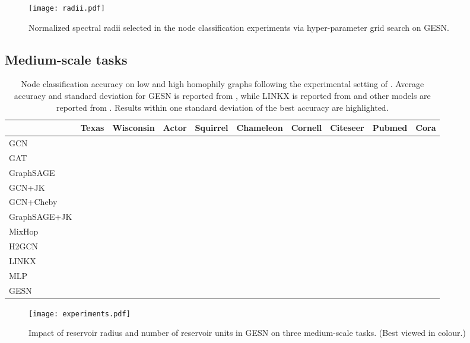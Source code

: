 \documentclass[final,5p,times,twocolumn]{elsarticle}
\begin{document}
\begin{figure}
	\centering
	\texttt{[image: radii.pdf]}
	\caption{Normalized spectral radii  selected in the node classification experiments via hyper-parameter grid search on GESN.}
	\label{fig:radii}
\end{figure}

\subsection{Medium-scale tasks}
\label{sec:experiments-medium}



\begin{table*}
	\centering
\begingroup
	\setlength{\tabcolsep}{4pt}
	\begin{tabular}{lccccccccc}
		\toprule
		& \textbf{Texas} & \textbf{Wisconsin} & \textbf{Actor} & \textbf{Squirrel} & \textbf{Chameleon} & \textbf{Cornell} & \textbf{Citeseer} & \textbf{Pubmed} & \textbf{Cora} \\
		\midrule
		GCN &  &  &  &  &  &  &  &  &  \\
		GAT &  &  &  &  &  &  &  &  &  \\
		GraphSAGE &  &  &  &  &  &  &  &  &  \\
		\midrule
		GCN+JK &  &  &  &  &  &  &  &  &  \\
		GCN+Cheby &  &  &  &  &  &  &  &  &  \\
		GraphSAGE+JK &  &  &  &  &  &  &  &  &  \\
		\midrule
		MixHop &  &  &  &  &  &  &  &  &  \\
		H2GCN &  &  &  &  &  &  &  &  &  \\
		LINKX &  &  &  &  &  &  &  &  &  \\
		\midrule
		MLP &  &  &  &  &  &  &  &  &  \\
		\midrule
		GESN &  &  &  &  &  &  &  &  &  \\
		\bottomrule
	\end{tabular}
	\endgroup
\caption{Node classification accuracy on low and high homophily graphs following the experimental setting of \cite{Zhu2020}. Average accuracy and standard deviation for GESN is reported from \cite{Tortorella2022esann}, while LINKX is reported from \cite{Lim2021} and other models are reported from \cite{Zhu2020}. Results within one standard deviation of the best accuracy are highlighted.}
\label{tab:experiments-esann}
\end{table*}

\begin{figure*}
	\centering
	\texttt{[image: experiments.pdf]}
	\caption{Impact of reservoir radius and number of reservoir units in GESN on three medium-scale tasks. (Best viewed in colour.)}
	\label{fig:esann-experiments}
\end{figure*}
\end{document}

